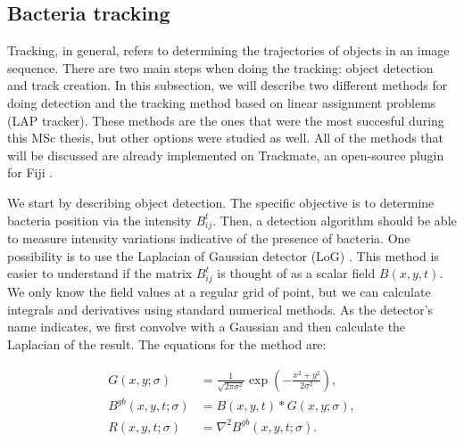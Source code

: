 \subsection{Bacteria tracking}


Tracking, in general, refers to determining the trajectories of objects in an image sequence. There are two main steps when doing the tracking: object detection and track creation. In this subsection, we will describe two different methods for doing detection and the tracking method based on linear assignment problems (LAP tracker). These methods are the ones that were the most succesful during this MSc thesis, but other options were studied as well. All of the methods that will be discussed are already implemented on Trackmate, an open-source plugin for Fiji \cite{Tinevez2017TrackMate:Tracking}. 


We start by describing object detection. The specific objective is to determine bacteria position via the intensity $B_{ij}^t$. Then, a detection algorithm should be able to measure intensity variations indicative of the presence of bacteria. One possibility is to use the Laplacian of Gaussian detector (LoG) \cite{Kong2013AApplications,Sage2005AutomaticDynamics}. This method is easier to understand if the matrix $B_{ij}^t$ is thought of as a scalar field $B(x,y,t)$. We only know the field values at a regular grid of point, but we can calculate integrals and derivatives using standard numerical methods. As the detector's name indicates, we first convolve with a Gaussian and then calculate the Laplacian of the result. The equations for the method are:  

\begin{align}
	G(x,y;\sigma) &= \frac{1}{\sqrt{2\pi \sigma^2}} \exp\left(  -\frac{x^2+y^2}{2\sigma^2} \right), \\
	B^{gb}(x,y,t;\sigma) &= B(x,y,t) * G(x,y;\sigma), \\
	R(x,y,t;\sigma)  &= \nabla^2 B^{gb}(x,y,t;\sigma). \label{LoG:result}
\end{align}

